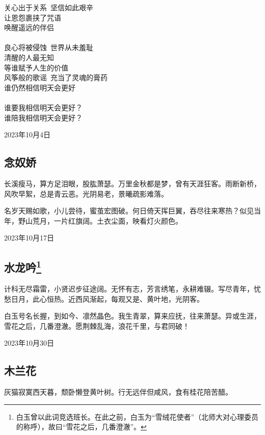 \documentclass[a5paper]{ctexart}
\begin{document}
\begin{center}
		关心出于关系\   坚信如此艰辛\\
		让恩怨裹挟了咒语\\
		唤醒遥远的伴侣\\
		\hspace*{\fill} \\
		良心将被侵蚀\   世界从未羞耻\\
		清醒的人最无知\\
		等谁赋予人生的价值\\
		风筝般的歌谣\   充当了灵魂的膏药\\
		谁仍然相信明天会更好\\
		\hspace*{\fill} \\
		谁要我相信明天会更好？\\
		谁陪我相信明天会更好？
	\end{center}
	\hfill 2023年10月4日
	
	\subsection[念奴娇（长溪瘦马）]{念奴娇}
	长溪瘦马，算方足泪眼，股肱萧瑟。万里金秋都是梦，曾有天涯狂客。雨断新桥，风吹早絮，总是青云恶。光阴易老，景曦疏影难落。
	
	名岁天赐如歌，小儿尝待，蜜茧宏图破。何日倚天挥巨翼，吞尽往来寒热？似见当年，野山荒月，一片红旗阔。土衣尘面，映看灯火颜色。
	\begin{flushright}
		2023年10月17日
	\end{flushright}
	
	\subsection[水龙吟（计科无尽霜雷）]{水龙吟\footnote{白玉曾以此词竞选班长。在此之前，白玉为“雪绒花使者”（北师大对心理委员的称呼），故曰“雪花之后，几番澄澈”。}}
	计科无尽霜雷，小贤迟步征途阔。无怀有志，芳言绣笔，永耕难辍。写尽青年，忧愁日月，此心恒热。近西风渐起，每观又是、黄叶地，光阴客。
	
	白玉号名长握，到如今、凛然晶色。我生青翠，算来应抚，往来萧瑟。异或生涯，雪花之后，几番澄澈。愿荆棘乱海，浪花千里，与君同破！
	\begin{flushright}
		2023年10月30日
	\end{flushright}
	
	\subsection[木兰花（灰猫寂寞西天暮）]{木兰花}
	灰猫寂寞西天暮，颓卧懒登黄叶树。行无远伴但咸风，食有桂花陪苦醋。
	
\end{document}
